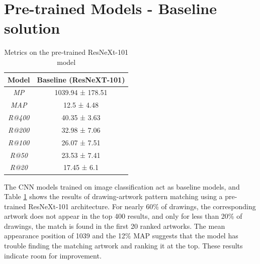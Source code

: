 

\section{Pre-trained Models - Baseline solution}

\begin{table}[ht]
    \centering
    \begin{tabular}{c|c}
    \hline \hline
        Model & Baseline (ResNeXT-101) \\ \hline \hline
        \textit{MP} & 1039.94 ± 178.51 \\
        \textit{MAP} & 12.5 ± 4.48 \\ 
        \textit{R@400} & 40.35 ± 3.63 \\
        \textit{R@200} & 32.98 ± 7.06 \\
        \textit{R@100} & 26.07 ± 7.51 \\
        \textit{R@50} & 23.53 ± 7.41 \\
        \textit{R@20} & 17.45 ± 6.1 \\ 
    \end{tabular}
    \caption{Metrics on the pre-trained ResNeXt-101 model}
    \label{tab:baseline-metrics}
\end{table}

The CNN models trained on image classification act as baseline models, and Table \ref{tab:baseline-metrics} shows the results of drawing-artwork pattern matching using a pre-trained ResNeXt-101 architecture. For nearly 60\% of drawings, the corresponding artwork does not appear in the top 400 results, and only for less than 20\% of drawings, the match is found in the first 20 ranked artworks. The mean appearance position of 1039 and the 12\% MAP suggests that the model has trouble finding the matching artwork and ranking it at the top. These results indicate room for improvement.

